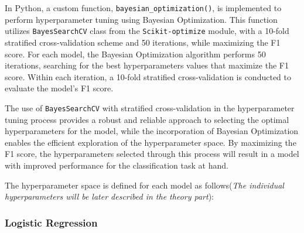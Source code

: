         
        
        
        
        In Python, a custom function, \lstinline{bayesian_optimization()}, is implemented to perform hyperparameter tuning using Bayesian Optimization.
        This function utilizes \lstinline{BayesSearchCV} class from the \lstinline{Scikit-optimize} module, with a 10-fold stratified cross-validation scheme and 50 iterations, while maximizing the F1 score.
        For each model, the Bayesian Optimization algorithm performs 50 iterations, searching for the best hyperparameters values that maximize the F1 score. Within each iteration, a 10-fold stratified cross-validation is conducted to evaluate the model's F1 score.
        
        The use of \lstinline{BayesSearchCV} with stratified cross-validation in the hyperparameter tuning process provides a robust and reliable approach to selecting the optimal hyperparameters for the model, while the incorporation of Bayesian Optimization enables the efficient exploration of the hyperparameter space.
        By maximizing the F1 score, the hyperparameters selected through this process will result in a model with improved performance for the classification task at hand.
        
        The hyperparameter space is defined for each model as follows(\textit{The individual hyperparameters will be later described in the theory part}):
        \subsubsection{Logistic Regression}
        
